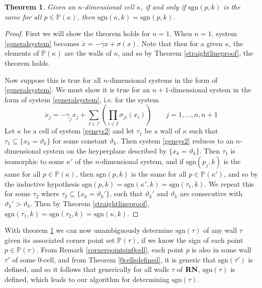 \documentclass[12pt]{article}
\newtheorem{theorem}{Theorem}[section]
\theoremstyle{definition}
\theoremstyle{remark}
\newcommand\sgn{\text{sgn}}
\newcommand{\bbP}{\mathbb{P}}
\begin{document}
\begin{theorem} \label{cornerpointproof}
Given an $n$-dimensional cell $\kappa$, if and only if $\sgn(p,k)$ is the same for all $p\in \bbP (\kappa)$,  then $\sgn(\kappa,k)=\sgn(p,k)$. 
\end{theorem}

\begin{proof}
First we will show the theorem holds for $n=1$. When $n=1$, system \eqref{generalsystem} becomes $\dot{x}=-\gamma x + \sigma(x)$. Note that then for a given $\kappa$, the elements of $\bbP(\kappa)$ are the walls of $\kappa$, and so by Theorem \ref{straightlineproof}, the theorem holds.

Now suppose this is true for all $n$-dimensional systems in the form of \eqref{generalsystem}. We must show it is true for an $n+1$-dimensional system in the form of system \eqref{generalsystem}, i.e. for the system
\begin{equation} \label{gensys2}
\dot{x}_j=-\gamma_j x_j + \sum_{I\in \mathcal{I}}\left(\prod_{i\in I}\sigma_{ji}(x_i)\right)	\qquad	j=1,\dots,n,n+1
\end{equation}
Let $\kappa$ be a cell of system \eqref{gensys2} and let $\tau_1$ be a wall of $\kappa$ such that $\tau_1 \subseteq \{x_k=\vartheta_k\}$ for some constant $\vartheta_k$. Then system \eqref{gensys2} reduces to an $n$-dimensional system on the heyperplane described by $\{x_k=\vartheta_k\}$. Then $\tau_1$ is isomorphic to some $\kappa'$ of the $n$-dimensional system, and if $\sgn(p_j,k)$ is the same for all $p\in \bbP (\kappa)$, then $\sgn(p,k)$ is the same for all $p\in \bbP (\kappa')$, and so by the inductive hypothesis $\sgn(p,k)=\sgn(\kappa',k)=\sgn(\tau_1,k)$. We repeat this for some $\tau_2$ where $\tau_2 \subseteq \{x_k=\vartheta_k'\}$, such that $\vartheta_k'$ and $\vartheta_k$ are consecutive with $\vartheta_k' > \vartheta_k$. Then by Theorem \ref{straightlineproof}, $\sgn(\tau_1,k)=\sgn(\tau_2,k)=\sgn(\kappa,k)$.
\end{proof}

With theorem \ref{cornerpointproof} we can now unambiguously determine $\sgn(\tau)$ of any wall $\tau$ given its associated corner point set $\bbP(\tau)$, if we know the sign of each point $p\in\bbP(\tau)$. From Remark \ref{cornerpointsin0cell}, each point $p$ is also in some wall $\tau'$ of some $0$-cell, and from Theorem \ref{0cellsdefined}, it is generic that $\sgn(\tau')$ is defined, and so it follows that generically for all walls $\tau$ of $\textnormal{\textbf{RN}}$,  $\sgn(\tau)$ is defined, which leads to our algorithm for determining $\sgn(\tau)$. 
\end{document}
